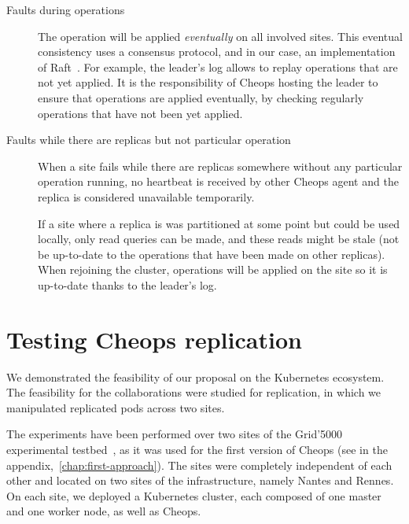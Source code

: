 \begin{description}

\item [Faults during operations]


The operation will be applied \emph{eventually} on all involved
sites.
%
This eventual consistency uses a consensus protocol, and in our
case, an implementation of Raft~\cite{OO14}.
%
For example, the leader's log allows to replay operations that are not
yet applied.
%
It is the responsibility of Cheops hosting the leader to ensure that
operations are applied eventually, by checking regularly operations
that have not been yet applied.


\item[Faults while there are replicas but not particular operation]

When a site fails while there are replicas somewhere without any
particular operation running, no heartbeat is received by other Cheops
agent and the replica is considered unavailable temporarily.

If a site where a replica is was partitioned at some point but could
be used locally, only read queries can be made, and these reads might
be stale (not be up-to-date to the operations that have been made on
other replicas). When rejoining the cluster, operations will be
applied on the site so it is up-to-date thanks to the leader's log.

\end{description}



\section{Testing Cheops replication}
\label{sec:validation}

We demonstrated the feasibility of our proposal on the Kubernetes
ecosystem.
%
The feasibility for the collaborations were studied for replication,
in which we manipulated replicated pods across two sites.
%


The experiments have been performed over two sites of the Grid'5000
experimental testbed~\cite{grid5000}, as it was used for the first
version of Cheops (see in the
appendix,~\autoref{chap:first-approach}).
%
The sites were completely independent of each other and located on two
sites of the infrastructure, namely Nantes and Rennes.
%
On each site, we deployed a Kubernetes cluster, each composed of one
master and one worker node, as well as Cheops.


